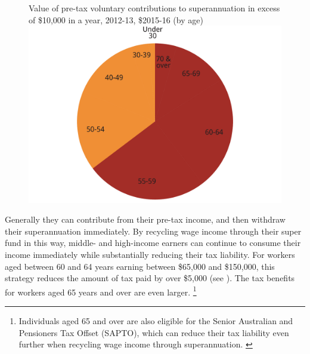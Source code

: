 \begin{figure}
%
{Value of pre-tax voluntary contributions to superannuation in excess of \$10,000 in a year, 2012-13, \$2015-16 (by age)}
\includegraphics[width=\linewidth, clip]{b5-super-atlas/Figure4-7-1.pdf}
\end{figure}

Generally they can contribute from their pre-tax income, and then withdraw their superannuation immediately. By recycling wage income through their super fund in this way, middle- and high-income earners can continue to consume their income immediately while substantially reducing their tax liability. For workers aged between 60 and 64 years earning between \$65,000 and \$150,000, this strategy reduces the amount of tax paid by over \$5,000 (see ). The tax benefits for workers aged 65 years and over are even larger.%
\footnote{Individuals aged 65 and over are also eligible for the Senior Australian and Pensioners Tax Offset (SAPTO), which can reduce their tax liability even further when recycling wage income through superannuation. \textcite{ATO2015-Beneficiary-tax-offset-sapto-calculator}} 





